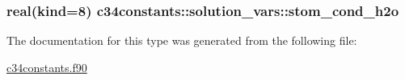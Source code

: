 \subsubsection[{stom\+\_\+cond\+\_\+h2o}]{\setlength{\rightskip}{0pt plus 5cm}real(kind=8) c34constants\+::solution\+\_\+vars\+::stom\+\_\+cond\+\_\+h2o}\label{structc34constants_1_1solution__vars_af8670de0f15d89016b814037183ece8e}


The documentation for this type was generated from the following file\+:\begin{DoxyCompactItemize}
\item 
\hyperlink{c34constants_8f90}{c34constants.\+f90}\end{DoxyCompactItemize}
